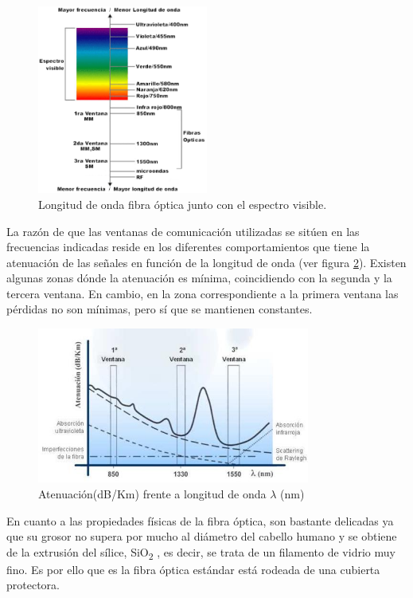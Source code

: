 	 \begin{figure}[H]
	 	\centering
	 	\includegraphics[width=0.5\textwidth]{./img/ventana}
	 	\caption{Longitud de onda fibra óptica junto con el espectro visible. \cite{ventanasFO}}
	 	\label{fig:ventanaOptica}
	 \end{figure}
 	La razón de que las ventanas de comunicación utilizadas se sitúen en las frecuencias indicadas reside en los diferentes comportamientos que tiene la atenuación de las señales en función de la longitud de onda (ver figura \ref{fig:perdidasFrec}). Existen algunas zonas dónde la atenuación es mínima, coincidiendo con la segunda y la tercera ventana. En cambio, en la zona correspondiente a la primera ventana las pérdidas no son mínimas, pero sí que se mantienen constantes. 	
 	
 	\begin{figure}[H]
 		\centering
 		\includegraphics[width=0.8\textwidth]{./img/perdidasFrec}
 		\caption{Atenuación(dB/Km) frente a longitud de onda  $\lambda$ (nm) \cite{imgRadioModo}}
 		\label{fig:perdidasFrec}
 	\end{figure}

 En cuanto a las propiedades físicas de la fibra óptica, son bastante delicadas ya que su grosor no supera por mucho al diámetro del cabello humano y se obtiene de la extrusión del sílice, SiO\textsubscript{2} , es decir, se trata de un filamento de vidrio muy fino. Es por ello que es la fibra óptica estándar está rodeada de una cubierta protectora. 
 
